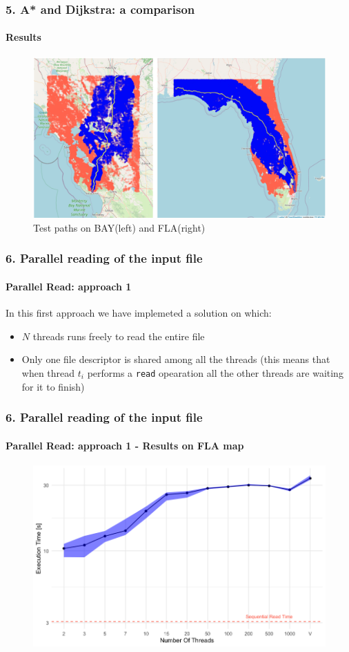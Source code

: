 \documentclass[12pt]{beamer}
\begin{document}
	\begin{frame}
		\frametitle{5. A* and Dijkstra: a comparison}
		\framesubtitle{Results}
		\begin{figure}[ht!]
			\centering
			\includegraphics[width=1\linewidth]{dijkstra_astar.png}
			\caption{Test paths on BAY(left) and FLA(right)}
			\label{astardijkstra}
		\end{figure}
	\end{frame}
	\begin{frame}
		\frametitle{6. Parallel reading of the input file}
		\framesubtitle{Parallel Read: approach 1}
		In this first approach we have implemeted a solution on which:
		\begin{itemize}
		\item $N$ threads runs freely to read the entire file
		\item Only one file descriptor is shared among all the threads (this means that
				when thread $t_i$ performs a \texttt{read} opearation all the other threads 
				are waiting for it to finish)
		\end{itemize}
	\end{frame}
	\begin{frame}
		\frametitle{6. Parallel reading of the input file}
		\framesubtitle{Parallel Read: approach 1 - Results on FLA map}
		\begin{figure}[ht!]
			\centering
			\includegraphics[width=1\linewidth]{par_read_1_time.png}
			\label{parread1time}
	 	 \end{figure}	
	\end{frame}
\end{document}
